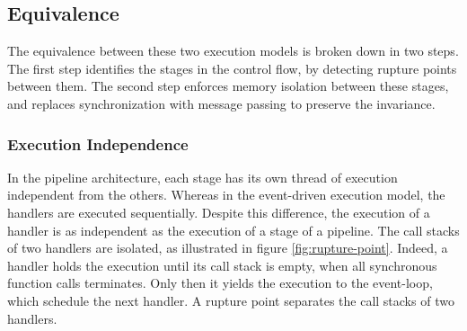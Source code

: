


\subsection{Equivalence} \label{chapter4:equivalence}

The equivalence between these two execution models is broken down in two steps. %
The first step identifies the stages in the control flow, by detecting rupture points between them.
The second step enforces memory isolation between these stages, and replaces synchronization with message passing to preserve the invariance.

\subsubsection{Execution Independence}

In the pipeline architecture, each stage has its own thread of execution independent from the others.
Whereas in the event-driven execution model, the handlers are executed sequentially.
Despite this difference, the execution of a handler is as independent as the execution of a stage of a pipeline.
The call stacks of two handlers are isolated, as illustrated in figure \ref{fig:rupture-point}.
Indeed, a handler holds the execution until its call stack is empty, when all synchronous function calls terminates. Only then it yields the execution to the event-loop, which schedule the next handler.
A rupture point separates the call stacks of two handlers.

